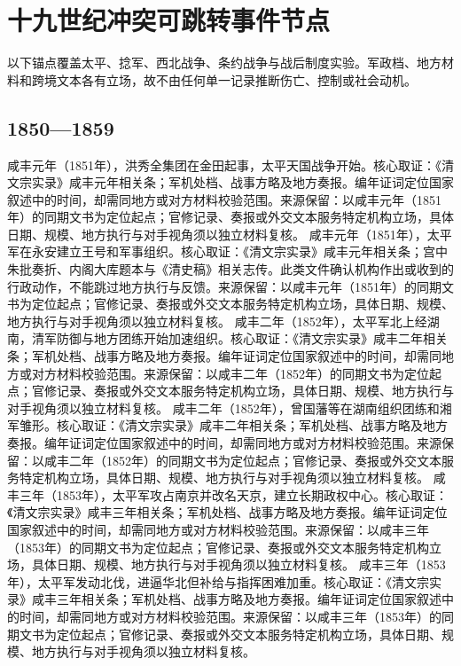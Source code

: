 \section{十九世纪冲突可跳转事件节点}
以下锚点覆盖太平、捻军、西北战争、条约战争与战后制度实验。军政档、地方材料和跨境文本各有立场，故不由任何单一记录推断伤亡、控制或社会动机。
\subsection{1850—1859}
咸丰元年（1851年），洪秀全集团在金田起事，太平天国战争开始。核心取证：《清文宗实录》咸丰元年相关条；军机处档、战事方略及地方奏报。编年证词定位国家叙述中的时间，却需同地方或对方材料校验范围。来源保留：以咸丰元年（1851年）的同期文书为定位起点；官修记录、奏报或外交文本服务特定机构立场，具体日期、规模、地方执行与对手视角须以独立材料复核。
咸丰元年（1851年），太平军在永安建立王号和军事组织。核心取证：《清文宗实录》咸丰元年相关条；宫中朱批奏折、内阁大库题本与《清史稿》相关志传。此类文件确认机构作出或收到的行政动作，不能跳过地方执行与反馈。来源保留：以咸丰元年（1851年）的同期文书为定位起点；官修记录、奏报或外交文本服务特定机构立场，具体日期、规模、地方执行与对手视角须以独立材料复核。
咸丰二年（1852年），太平军北上经湖南，清军防御与地方团练开始加速组织。核心取证：《清文宗实录》咸丰二年相关条；军机处档、战事方略及地方奏报。编年证词定位国家叙述中的时间，却需同地方或对方材料校验范围。来源保留：以咸丰二年（1852年）的同期文书为定位起点；官修记录、奏报或外交文本服务特定机构立场，具体日期、规模、地方执行与对手视角须以独立材料复核。
咸丰二年（1852年），曾国藩等在湖南组织团练和湘军雏形。核心取证：《清文宗实录》咸丰二年相关条；军机处档、战事方略及地方奏报。编年证词定位国家叙述中的时间，却需同地方或对方材料校验范围。来源保留：以咸丰二年（1852年）的同期文书为定位起点；官修记录、奏报或外交文本服务特定机构立场，具体日期、规模、地方执行与对手视角须以独立材料复核。
咸丰三年（1853年），太平军攻占南京并改名天京，建立长期政权中心。核心取证：《清文宗实录》咸丰三年相关条；军机处档、战事方略及地方奏报。编年证词定位国家叙述中的时间，却需同地方或对方材料校验范围。来源保留：以咸丰三年（1853年）的同期文书为定位起点；官修记录、奏报或外交文本服务特定机构立场，具体日期、规模、地方执行与对手视角须以独立材料复核。
咸丰三年（1853年），太平军发动北伐，进逼华北但补给与指挥困难加重。核心取证：《清文宗实录》咸丰三年相关条；军机处档、战事方略及地方奏报。编年证词定位国家叙述中的时间，却需同地方或对方材料校验范围。来源保留：以咸丰三年（1853年）的同期文书为定位起点；官修记录、奏报或外交文本服务特定机构立场，具体日期、规模、地方执行与对手视角须以独立材料复核。
